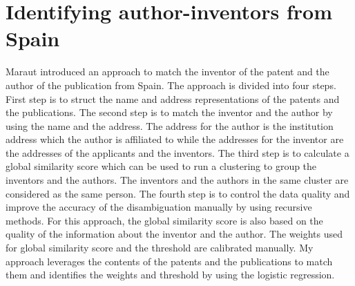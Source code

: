 \section{Identifying author-inventors from Spain}
Maraut introduced an approach to match the inventor of the patent and the author of the publication from Spain\cite{iaifs}. The approach is divided into four steps. First step is to struct the name and address representations of the patents and the publications. The second step is to match the inventor and the author by using the name and the address. The address for the author is the institution address which the author is affiliated to while the addresses for the inventor are the addresses of the applicants and the inventors. The third step is to calculate a global similarity score which can be used to run a clustering to group the inventors and the authors. The inventors and the authors in the same cluster are considered as the same person. The fourth step is to control the data quality and improve the accuracy of the disambiguation manually by using recursive methods. For this approach, the global similarity score is also  based on the quality of the  information about the inventor and the author. The weights used for global similarity score and the threshold are calibrated manually. My approach leverages the contents of the patents and the publications to match them and identifies the weights and threshold by using the logistic regression.


